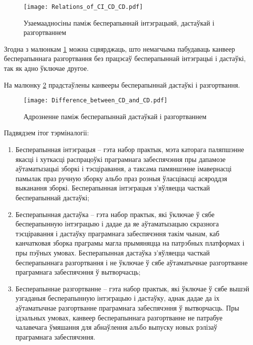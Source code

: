 \begin{figure}[h!]
    \centering
    \texttt{[image: Relations\_of\_CI\_CD\_CD.pdf]}
    \caption{Узаемаадносіны паміж бесперапыннай
             інтэграцыяй, дастаўкай і разгортваннем}
    \label{figure:relations of CI, CD, CD}
\end{figure}

Згодна з малюнкам \ref{figure:relations of CI, CD, CD}
можна сцвярджаць, што немагчыма пабудаваць канвеер бесперапыннага
разгортвання без працэсаў бесперапыннай інтэграцыі і дастаўкі,
так як адно ўключае другое.

На малюнку \ref{figure:Difference_between_CD_and_CD}
прадстаўлены канвееры бесперапыннай дастаўкі і разгортвання.

\begin{figure}[h!]
    \centering
    \texttt{[image: Difference\_between\_CD\_and\_CD.pdf]}
    \caption{Адрозненне паміж бесперапыннай дастаўкай і разгортваннем}
    \label{figure:Difference_between_CD_and_CD}
\end{figure}

Падвядзем ітог тэрміналогіі:
\begin{enumerate}
    \item Бесперапынная інтэграцыя -- гэта набор практык,
          мэта каторага паляпшэнне якасці і хуткасці распрацоўкі
          праграмнага забеспячэння пры дапамозе аўтаматызацыі
          зборкі і тэсціравання, а таксама памяншэнне імавернасці
          памылак праз ручную зборку альбо праз розныя
          ўласцівасці асяроддзя выканання зборкі.
          Бесперапынная інтэграцыя з'яўляецца часткай бесперапыннай
          дастаўкі;
    \item Бесперапынная дастаўка -- гэта набор практык,
          які ўключае ў сябе бесперапынную інтэграцыю і дадае 
          да яе аўтаматызацыю скразнога тэсціравання і дастаўку
          праграмнага забеспячэння такім чынам, каб канчатковая
          зборка праграмы магла прымяняцца на патрэбных платформах
          і пры пэўных умовах.
          Бесперапынная дастаўка з'яўляецца часткай бесперапыннага
          разгортвання і не ўключае ў сябе аўтаматычнае
          разгортванне праграмнага забеспячэння ў вытворчасць;
    \item Бесперапыннае разгортванне -- гэта набор практык, які
          ўключае ў сябе вышэй узгаданыя бесперапынную інтэграцыю
          і дастаўку, аднак дадае да іх аўтаматычнае разгортванне
          праграмнага забеспячэння ў вытворчасць.
          Пры ідэальных умовах, канвеер бесперапыннага разгортванне
          не патрабуе чалавечага ўмяшання для абнаўлення альбо выпуску
          новых рэлізаў праграмнага забеспячэння.
\end{enumerate}
